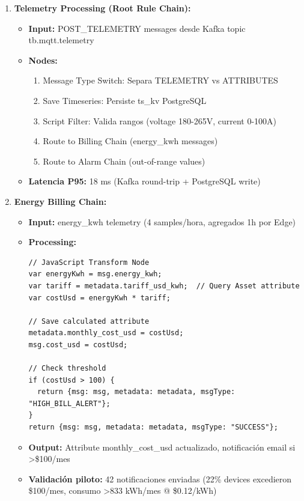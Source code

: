 \begin{enumerate}
    \item \textbf{Telemetry Processing (Root Rule Chain):}
    \begin{itemize}
        \item \textbf{Input:} POST\_TELEMETRY messages desde Kafka topic tb.mqtt.telemetry
        \item \textbf{Nodes:}
        \begin{enumerate}
            \item Message Type Switch: Separa TELEMETRY vs ATTRIBUTES
            \item Save Timeseries: Persiste ts\_kv PostgreSQL
            \item Script Filter: Valida rangos (voltage 180-265V, current 0-100A)
            \item Route to Billing Chain (energy\_kwh messages)
            \item Route to Alarm Chain (out-of-range values)
        \end{enumerate}
        \item \textbf{Latencia P95:} 18 ms (Kafka round-trip + PostgreSQL write)
    \end{itemize}
    
    \item \textbf{Energy Billing Chain:}
    \begin{itemize}
        \item \textbf{Input:} energy\_kwh telemetry (4 samples/hora, agregados 1h por Edge)
        \item \textbf{Processing:}
        \begin{verbatim}
// JavaScript Transform Node
var energyKwh = msg.energy_kwh;
var tariff = metadata.tariff_usd_kwh;  // Query Asset attribute
var costUsd = energyKwh * tariff;

// Save calculated attribute
metadata.monthly_cost_usd = costUsd;
msg.cost_usd = costUsd;

// Check threshold
if (costUsd > 100) {
  return {msg: msg, metadata: metadata, msgType: "HIGH_BILL_ALERT"};
}
return {msg: msg, metadata: metadata, msgType: "SUCCESS"};
        \end{verbatim}
        \item \textbf{Output:} Attribute monthly\_cost\_usd actualizado, notificación email si >\$100/mes
        \item \textbf{Validación piloto:} 42 notificaciones enviadas (22\% devices excedieron \$100/mes, consumo >833 kWh/mes @ \$0.12/kWh)
    \end{itemize}
    

\end{enumerate}
